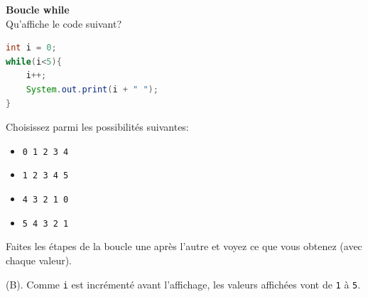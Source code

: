     
    \begin{Exercice}[5 minutes] [Java] \textbf{Boucle while}\\
      	Qu'affiche le code suivant?
      	
      	\begin{lstlisting}[language=Java]
int i = 0;
while(i<5){
    i++;
    System.out.print(i + " ");
}
     	\end{lstlisting}
             	
        Choisissez parmi les possibilités suivantes:
        
        \begin{itemize}
            \item[(A)] \texttt{0 1 2 3 4}
            \item[(B)] \texttt{1 2 3 4 5}
            \item[(C)] \texttt{4 3 2 1 0}
            \item[(D)] \texttt{5 4 3 2 1}
        \end{itemize}
    
        \begin{conseil}
		   Faites les étapes de la boucle une après l'autre et voyez ce que vous obtenez (avec chaque valeur).  
        \end{conseil}
        
        \begin{solution}
            (B). Comme \texttt{i} est incrémenté avant l'affichage, les valeurs affichées vont de \texttt{1} à \texttt{5}.
        \end{solution}
    \end{Exercice} 
	
